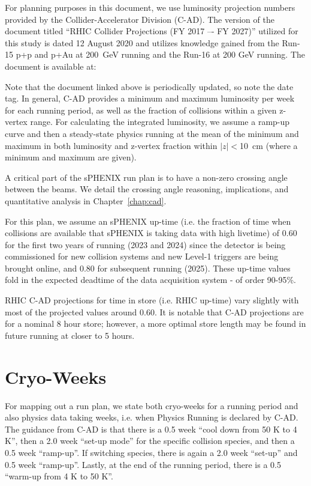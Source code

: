 For planning purposes in this document, we use luminosity projection numbers provided by the Collider-Accelerator Division (C-AD).   The version of the document titled 
``RHIC Collider Projections (FY 2017 –- FY 2027)'' utilized for this study is dated 12 August 2020 and utilizes knowledge gained from the Run-15 p+p and p+Au at 200~GeV running and the Run-16 \auau at 200 GeV running.   The document is available at:

\vspace{0.1in}
{\color{blue}{http://www.rhichome.bnl.gov/RHIC/Runs/RhicProjections.pdf}} 
\vspace{0.1in}

Note that the document linked above is periodically updated, so note the date tag.  In general, C-AD provides a minimum and maximum luminosity per week for each running period, as well as the fraction of collisions within a given z-vertex range. For calculating the integrated luminosity, we assume a ramp-up curve and then a steady-state physics running at the mean of the minimum and maximum in both luminosity and z-vertex fraction within $|z|<$10~cm (where a minimum and maximum are given).  

A critical part of the sPHENIX run plan is to have a non-zero crossing angle between the beams.    We detail the crossing angle reasoning, implications, and quantitative analysis in Chapter~\ref{chap:cad}.    

For this plan, we assume an sPHENIX up-time (i.e. the fraction of time when collisions are available that sPHENIX is taking data with high livetime) of 0.60 for the first two years of running (2023 and 2024) since the detector is being commissioned for new collision systems and new Level-1 triggers are being brought online, and 0.80 for subsequent running (2025).   These up-time values fold in the expected deadtime of the data acquisition system - of order 90-95\%.

RHIC C-AD projections for time in store (i.e. RHIC up-time) vary slightly with most of the projected values around 0.60. It is notable that C-AD projections are for a nominal 8 hour store; however, a more optimal store length may be found in future running at closer to 5 hours.

\section{Cryo-Weeks}

For mapping out a run plan, we state both cryo-weeks for a running period and also physics data taking weeks, i.e. when Physics Running is declared by C-AD.   The guidance from C-AD is that there is a 0.5 week ``cool down from 50 K to 4 K'', then a 2.0 week ``set-up mode'' for the specific collision species, and then a 0.5 week ``ramp-up''.   If switching species, there is again a 2.0 week ``set-up'' and 0.5 week ``ramp-up''.    Lastly, at the end of the running period, there is a 0.5 ``warm-up from 4 K to 50 K''.  


